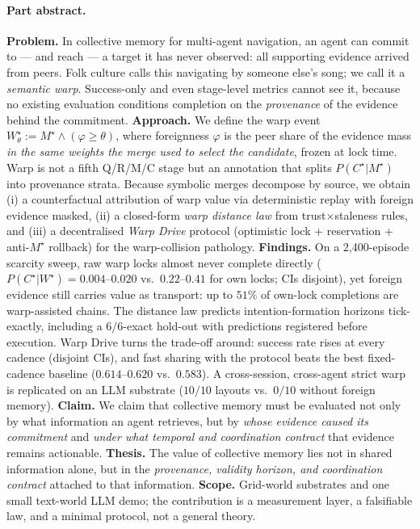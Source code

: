 \documentclass{article}
\newcommand{\wstar}{W^{\star}}
\newcommand{\mstar}{M^{\star}}
\newcommand{\cstar}{C^{\star}}
\begin{document}
\paragraph{Part abstract.} \textbf{Problem.} In collective memory for multi-agent navigation, an agent can commit to --- and reach --- a target it has never observed: all supporting evidence arrived from peers. Folk culture calls this navigating by someone else's song; we call it a \emph{semantic warp}. Success-only and even stage-level metrics cannot see it, because no existing evaluation conditions completion on the \emph{provenance} of the evidence behind the commitment.
\textbf{Approach.} We define the warp event $\wstar_\theta := \mstar \wedge (\varphi \ge \theta)$, where foreignness $\varphi$ is the peer share of the evidence mass \emph{in the same weights the merge used to select the candidate}, frozen at lock time. Warp is not a fifth Q/R/M/C stage but an annotation that splits $P(\cstar|\mstar)$ into provenance strata. Because symbolic merges decompose by source, we obtain (i) a counterfactual attribution of warp value via deterministic replay with foreign evidence masked, (ii) a closed-form \emph{warp distance law} from trust$\times$staleness rules, and (iii) a decentralised \emph{Warp Drive} protocol (optimistic lock + reservation + anti-$\mstar$ rollback) for the warp-collision pathology.
\textbf{Findings.} On a 2{,}400-episode scarcity sweep, raw warp locks almost never complete directly ($P(\cstar|\wstar)=0.004$--$0.020$ vs.\ $0.22$--$0.41$ for own locks; CIs disjoint), yet foreign evidence still carries value as transport: up to $51\%$ of own-lock completions are warp-assisted chains. The distance law predicts intention-formation horizons tick-exactly, including a $6/6$-exact hold-out with predictions registered before execution. Warp Drive turns the trade-off around: success rate rises at every cadence (disjoint CIs), and fast sharing with the protocol beats the best fixed-cadence baseline ($0.614$--$0.620$ vs.\ $0.583$). A cross-session, cross-agent strict warp is replicated on an LLM substrate ($10/10$ layouts vs.\ $0/10$ without foreign memory).
\textbf{Claim.} We claim that collective memory must be evaluated not only by what information an agent retrieves, but by \emph{whose evidence caused its commitment} and \emph{under what temporal and coordination contract} that evidence remains actionable.
\textbf{Thesis.} The value of collective memory lies not in shared information alone, but in the \emph{provenance, validity horizon, and coordination contract} attached to that information.
\textbf{Scope.} Grid-world substrates and one small text-world LLM demo; the contribution is a measurement layer, a falsifiable law, and a minimal protocol, not a general theory.
\end{document}
